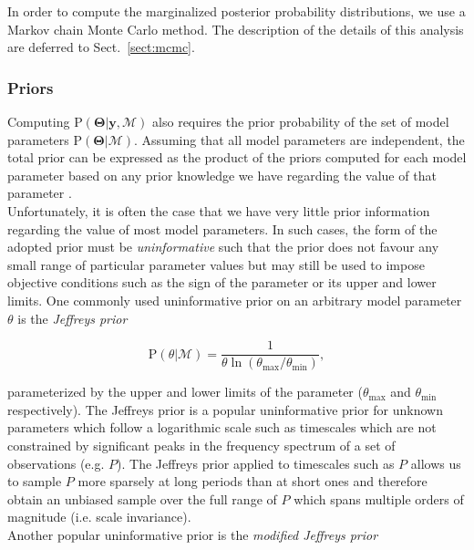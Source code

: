 In order to compute the marginalized posterior probability distributions, we use a Markov 
chain Monte Carlo method. The description of the details of this analysis are deferred to 
Sect.~\ref{sect:mcmc}. 

\subsubsection{Priors} \label{sect:priors}
Computing $\mathrm{P} (\mathbf{\Theta} | \mathbf{y}, \mathcal{M})$ also requires the prior 
probability of the set of model parameters $\mathrm{P} (\mathbf{\Theta} | \mathcal{M})$. 
Assuming that all model parameters are independent, the total prior can be expressed as 
the product of the priors computed for each model parameter %
based on any prior knowledge we have regarding the value of that parameter 
\parencite{gregory05}. \\

Unfortunately, it is often the case that we have very little 
prior information regarding the value of most model parameters. In such cases, the form 
of the adopted prior must be \emph{uninformative} such that the prior does not favour 
any small range of particular parameter values but may still be used to 
impose objective conditions 
such as the sign of the parameter or its upper and lower limits. One commonly used 
uninformative prior on an arbitrary model parameter $\theta$ is the 
\emph{Jeffreys prior} \parencite{gregory07} 

\begin{equation}
\mathrm{P} (\theta | \mathcal{M}) = \frac{1}{\theta \ln{(\theta_{\mathrm{max}} / 
\theta_{\mathrm{min}})}},
\end{equation}

\noindent parameterized by the upper and lower limits of the parameter 
($\theta_{\mathrm{max}}$ and $\theta_{\mathrm{min}}$ respectively). 
The Jeffreys prior is a popular uninformative prior for unknown parameters 
which follow a logarithmic scale such as timescales which are 
not constrained by significant 
peaks in the frequency spectrum of a set of observations (e.g. $P$). The Jeffreys prior 
applied to timescales such as $P$ allows us to sample $P$ more sparsely at long 
periods than at short ones and therefore obtain an unbiased sample over the 
full range of $P$ which spans multiple orders of magnitude (i.e. scale 
invariance). \\

Another popular uninformative prior is the \emph{modified Jeffreys prior} 
\parencite{gregory07}

